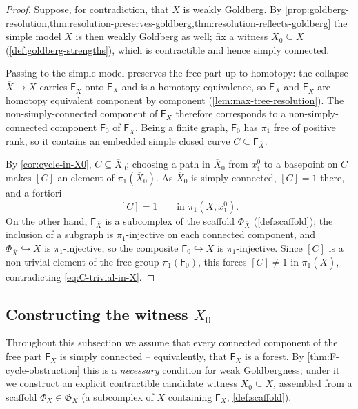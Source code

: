 \documentclass[reqno]{amsart}
\theoremstyle{definition}
\renewcommand{\bar}{\overline}
\numberwithin{equation}{section}
\begin{document}
\begin{proof}
Suppose, for contradiction, that \(X\) is weakly Goldberg. By
\cref{prop:goldberg-resolution,thm:resolution-preserves-goldberg,thm:resolution-reflects-goldberg}
the simple model \(\bar X\) is then weakly Goldberg as well; fix a
witness \(\bar X_0\subseteq\bar X\) (\cref{def:goldberg-strengths}),
which is contractible and hence simply connected.

Passing to the simple model preserves the free part up to homotopy: the
collapse \(\bar X\to X\) carries \(\mathsf{F}_{\bar X}\) onto
\(\mathsf{F}_X\) and is a homotopy equivalence, so \(\mathsf{F}_X\) and
\(\mathsf{F}_{\bar X}\) are homotopy equivalent component by component
(\cref{lem:max-tree-resolution}). The non-simply-connected component of
\(\mathsf{F}_X\) therefore corresponds to a non-simply-connected
component \(\mathsf{F}_0\) of \(\mathsf{F}_{\bar X}\). Being a finite
graph, \(\mathsf{F}_0\) has \(\pi_1\) free of positive rank, so it
contains an embedded simple closed curve \(C\subseteq\mathsf{F}_{\bar X}\).

By \cref{cor:cycle-in-X0}, \(C\subseteq\bar X_0\); choosing a path in
\(\bar X_0\) from \(x_1^0\) to a basepoint on \(C\) makes \([C]\) an
element of \(\pi_1(\bar X_0)\). As \(\bar X_0\) is simply connected,
\([C]=1\) there, and a fortiori
\begin{equation}\label{eq:C-trivial-in-X}
[C] = 1 \qquad\text{in } \pi_1(\bar X,x_1^0).
\end{equation}
On the other hand, \(\mathsf{F}_{\bar X}\) is a subcomplex of the scaffold \(\Phi_{\bar X}\) (\cref{def:scaffold}); the inclusion of a
subgraph is \(\pi_1\)-injective on each connected component, and
\(\Phi_{\bar X}\hookrightarrow\bar X\) is \(\pi_1\)-injective, so the
composite \(\mathsf{F}_0\hookrightarrow\bar X\) is \(\pi_1\)-injective.
Since \([C]\) is a non-trivial element of the free group
\(\pi_1(\mathsf{F}_0)\), this forces \([C]\neq 1\) in \(\pi_1(\bar X)\),
contradicting \eqref{eq:C-trivial-in-X}.
\end{proof}


\subsection{Constructing the witness \(X_0\)}
\label{ssec:witness-construction}

Throughout this subsection we assume that every connected
component of the free part \(\mathsf{F}_X\) is simply connected --
equivalently, that \(\mathsf{F}_X\) is a forest. By
\cref{thm:F-cycle-obstruction} this is a \emph{necessary}
condition for weak Goldbergness; under it we construct an
explicit contractible candidate witness \(X_0\subseteq X\),
assembled from a scaffold \(\Phi_X\in\mathfrak{G}_X\) (a
subcomplex of \(X\) containing \(\mathsf{F}_X\),
\cref{def:scaffold}).
\end{document}
